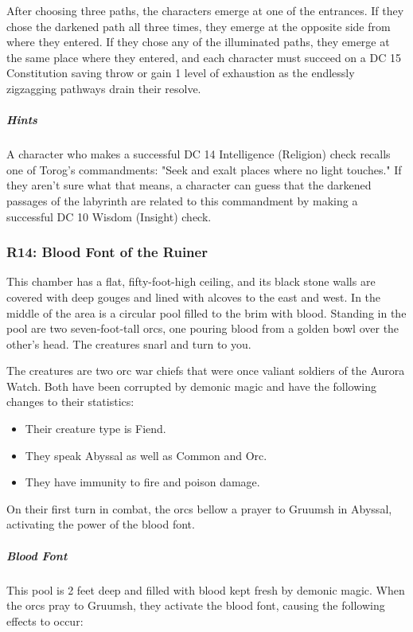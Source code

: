 \documentclass[10pt,a4paper,twoside,fancy,bg=print,twocolumn,openany,nodeprecatedcode]{dndbook}
\begin{document}
After choosing three paths, the characters emerge at one of the entrances. If they chose the darkened path all three times, they emerge at the opposite side from where they entered. If they chose any of the illuminated paths, they emerge at the same place where they entered, and each character must succeed on a DC 15 Constitution saving throw or gain 1 level of exhaustion as the endlessly zigzagging pathways drain their resolve.

\subparagraph{Hints}
A character who makes a successful DC 14 Intelligence (Religion) check recalls one of Torog's commandments: "Seek and exalt places where no light touches." If they aren't sure what that means, a character can guess that the darkened passages of the labyrinth are related to this commandment by making a successful DC 10 Wisdom (Insight) check.

\subsubsection{R14: Blood Font of the Ruiner}
\begin{DndReadAloud}{}
This chamber has a flat, fifty-foot-high ceiling, and its black stone walls are covered with deep gouges and lined with alcoves to the east and west. In the middle of the area is a circular pool filled to the brim with blood. Standing in the pool are two seven-foot-tall orcs, one pouring blood from a golden bowl over the other's head. The creatures snarl and turn to you.

\end{DndReadAloud}

The creatures are two orc war chiefs that were once valiant soldiers of the Aurora Watch. Both have been corrupted by demonic magic and have the following changes to their statistics:


\begin{itemize}
\item Their creature type is Fiend.
\item They speak Abyssal as well as Common and Orc.
\item They have immunity to fire and poison damage.
\end{itemize}

On their first turn in combat, the orcs bellow a prayer to Gruumsh in Abyssal, activating the power of the blood font.

\subparagraph{Blood Font}
This pool is 2 feet deep and filled with blood kept fresh by demonic magic. When the orcs pray to Gruumsh, they activate the blood font, causing the following effects to occur:
\end{document}
